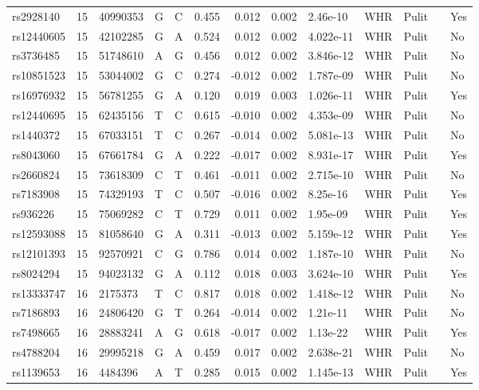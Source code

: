 \documentclass[11pt,twoside]{bristolthesis}
\begin{document}
\begin{longtable}[t]{lrlllrrrlllll}
rs2928140 & 15 & 40990353 & G & C & 0.455 & 0.012 & 0.002 & 2.46e-10 & WHR & Pulit &  & Yes\\
rs12440605 & 15 & 42102285 & G & A & 0.524 & 0.012 & 0.002 & 4.022e-11 & WHR & Pulit &  & No\\
rs3736485 & 15 & 51748610 & A & G & 0.456 & 0.012 & 0.002 & 3.846e-12 & WHR & Pulit &  & No\\
\addlinespace
rs10851523 & 15 & 53044002 & G & C & 0.274 & -0.012 & 0.002 & 1.787e-09 & WHR & Pulit &  & No\\
rs16976932 & 15 & 56781255 & G & A & 0.120 & 0.019 & 0.003 & 1.026e-11 & WHR & Pulit &  & Yes\\
rs12440695 & 15 & 62435156 & T & C & 0.615 & -0.010 & 0.002 & 4.353e-09 & WHR & Pulit &  & No\\
rs1440372 & 15 & 67033151 & T & C & 0.267 & -0.014 & 0.002 & 5.081e-13 & WHR & Pulit &  & No\\
rs8043060 & 15 & 67661784 & G & A & 0.222 & -0.017 & 0.002 & 8.931e-17 & WHR & Pulit &  & Yes\\
\addlinespace
rs2660824 & 15 & 73618309 & C & T & 0.461 & -0.011 & 0.002 & 2.715e-10 & WHR & Pulit &  & No\\
rs7183908 & 15 & 74329193 & T & C & 0.507 & -0.016 & 0.002 & 8.25e-16 & WHR & Pulit &  & Yes\\
rs936226 & 15 & 75069282 & C & T & 0.729 & 0.011 & 0.002 & 1.95e-09 & WHR & Pulit &  & Yes\\
rs12593088 & 15 & 81058640 & G & A & 0.311 & -0.013 & 0.002 & 5.159e-12 & WHR & Pulit &  & Yes\\
rs12101393 & 15 & 92570921 & C & G & 0.786 & 0.014 & 0.002 & 1.187e-10 & WHR & Pulit &  & No\\
\addlinespace
rs8024294 & 15 & 94023132 & G & A & 0.112 & 0.018 & 0.003 & 3.624e-10 & WHR & Pulit &  & Yes\\
rs13333747 & 16 & 2175373 & T & C & 0.817 & 0.018 & 0.002 & 1.418e-12 & WHR & Pulit &  & No\\
rs7186893 & 16 & 24806420 & G & T & 0.264 & -0.014 & 0.002 & 1.21e-11 & WHR & Pulit &  & No\\
rs7498665 & 16 & 28883241 & A & G & 0.618 & -0.017 & 0.002 & 1.13e-22 & WHR & Pulit &  & Yes\\
rs4788204 & 16 & 29995218 & G & A & 0.459 & 0.017 & 0.002 & 2.638e-21 & WHR & Pulit &  & No\\
\addlinespace
rs1139653 & 16 & 4484396 & A & T & 0.285 & 0.015 & 0.002 & 1.145e-13 & WHR & Pulit &  & Yes\\

\end{longtable}
\end{document}
